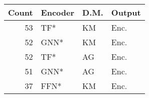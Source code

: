 \begin{tabular}{rlll}
\toprule
Count & Encoder & D.M. & Output \\
\midrule
53 & TF* & KM & Enc. \\
52 & GNN* & KM & Enc. \\
52 & TF* & AG & Enc. \\
51 & GNN* & AG & Enc. \\
37 & FFN* & KM & Enc. \\
\bottomrule
\end{tabular}
